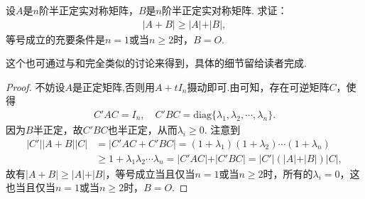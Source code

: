 \documentclass[../../main.tex]{subfiles}
\begin{document}
\begin{proposition}\label{proposition:例9.76}
设\(A\)是\(n\)阶半正定实对称矩阵，\(B\)是\(n\)阶半正定实对称矩阵. 求证：
\begin{align*}
\vert A + B\vert\geqslant \vert A\vert+\vert B\vert,
\end{align*}
等号成立的充要条件是\(n = 1\)或当\(n\geqslant 2\)时，\(B = O\).
\end{proposition}
\begin{remark}
这个也可通过与和完全类似的讨论来得到，具体的细节留给读者完成. 
\end{remark}
\begin{proof}
不妨设$A$是正定矩阵,否则用$A+tI_n$摄动即可.由可知，存在可逆矩阵\(C\)，使得
\begin{align*}
C'AC = I_n,\quad C'BC = \mathrm{diag}\{\lambda_1,\lambda_2,\cdots,\lambda_n\}.
\end{align*}
因为\(B\)半正定，故\(C'BC\)也半正定，从而\(\lambda_i\geqslant 0\). 注意到
\begin{align*}
\vert C'\vert\vert A + B\vert\vert C\vert&=\vert C'AC + C'BC\vert=(1 + \lambda_1)(1 + \lambda_2)\cdots(1 + \lambda_n)\\
&\geqslant 1 + \lambda_1\lambda_2\cdots\lambda_n=\vert C'AC\vert+\vert C'BC\vert=\vert C'\vert(\vert A\vert+\vert B\vert)\vert C\vert,
\end{align*}
故有\(\vert A + B\vert\geqslant \vert A\vert+\vert B\vert\)，等号成立当且仅当\(n = 1\)或当\(n\geqslant 2\)时，所有的\(\lambda_i = 0\)，这也当且仅当\(n = 1\)或当\(n\geqslant 2\)时，\(B = O\).

\end{proof}
\end{document}
